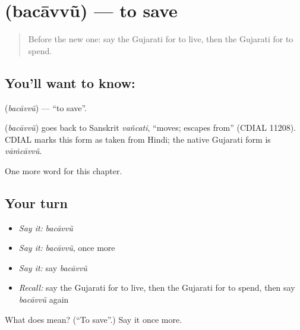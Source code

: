 \section[\texorpdfstring{\gu{બચાવવું} (bacāvvũ)}{બચાવવું (bacāvvũ)}]{ (bacāvvũ) — to save}

\label{lesson:GU-C142-bacavvu}



\begin{quote}
Before the new one: say the Gujarati for to live, then the Gujarati for to spend.
\end{quote}

\subsection*{You'll want to know: }
\textbf{} (\emph{bacāvvũ}) — \textquotedblleft{}to save\textquotedblright{}.

\begin{cousinweb}
\textbf{} (\emph{bacāvvũ}) goes back to Sanskrit \emph{vañcati}, \textquotedblleft{}moves; escapes from\textquotedblright{} (CDIAL 11208). CDIAL marks this form as taken from Hindi; the native Gujarati form is \emph{vāṁcāvvũ}.
\end{cousinweb}

\begin{grammarlens}[title={What you've built}]
One more word for this chapter.
\end{grammarlens}

\subsection*{Your turn}
\begin{itemize}
\raggedright
  \item \emph{Say it:} \emph{bacāvvũ}
  \item \emph{Say it:} \emph{bacāvvũ}, once more
  \item \emph{Say it:} say \emph{bacāvvũ}
  \item \emph{Recall:} say the Gujarati for to live, then the Gujarati for to spend, then say \emph{bacāvvũ} again
\end{itemize}

\begin{tcolorbox}[breakable,colback=teal!4,colframe=teal!35!black,title={Before you move on}]
What does  mean? (\textquotedblleft{}To save\textquotedblright{}.) Say it once more.
\end{tcolorbox}
